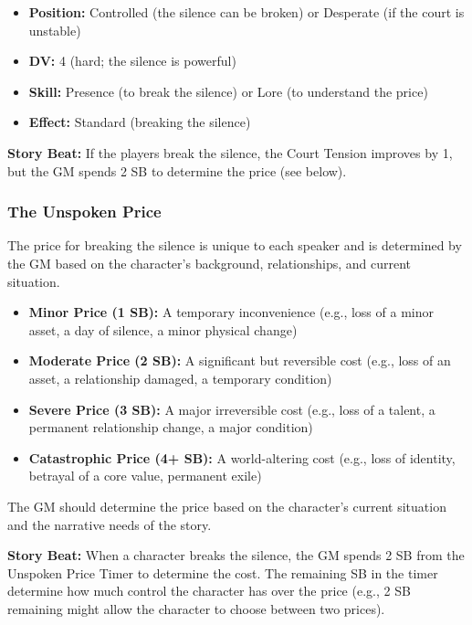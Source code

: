 \documentclass{article}
\begin{document}
\begin{itemize}
    \item \textbf{Position:} Controlled (the silence can be broken) or Desperate (if the court is unstable)
    \item \textbf{DV:} 4 (hard; the silence is powerful)
    \item \textbf{Skill:} Presence (to break the silence) or Lore (to understand the price)
    \item \textbf{Effect:} Standard (breaking the silence)
\end{itemize}

\begin{storybox}
\textbf{Story Beat:} If the players break the silence, the Court Tension improves by 1, but the GM spends 2 SB to determine the price (see below).
\end{storybox}

\subsubsection{The Unspoken Price}

The price for breaking the silence is unique to each speaker and is determined by the GM based on the character's background, relationships, and current situation.

\begin{itemize}
    \item \textbf{Minor Price (1 SB):} A temporary inconvenience (e.g., loss of a minor asset, a day of silence, a minor physical change)
    \item \textbf{Moderate Price (2 SB):} A significant but reversible cost (e.g., loss of an asset, a relationship damaged, a temporary condition)
    \item \textbf{Severe Price (3 SB):} A major irreversible cost (e.g., loss of a talent, a permanent relationship change, a major condition)
    \item \textbf{Catastrophic Price (4+ SB):} A world-altering cost (e.g., loss of identity, betrayal of a core value, permanent exile)
\end{itemize}

The GM should determine the price based on the character's current situation and the narrative needs of the story.

\begin{storybox}
\textbf{Story Beat:} When a character breaks the silence, the GM spends 2 SB from the Unspoken Price Timer to determine the cost. The remaining SB in the timer determine how much control the character has over the price (e.g., 2 SB remaining might allow the character to choose between two prices).
\end{storybox}
\end{document}

